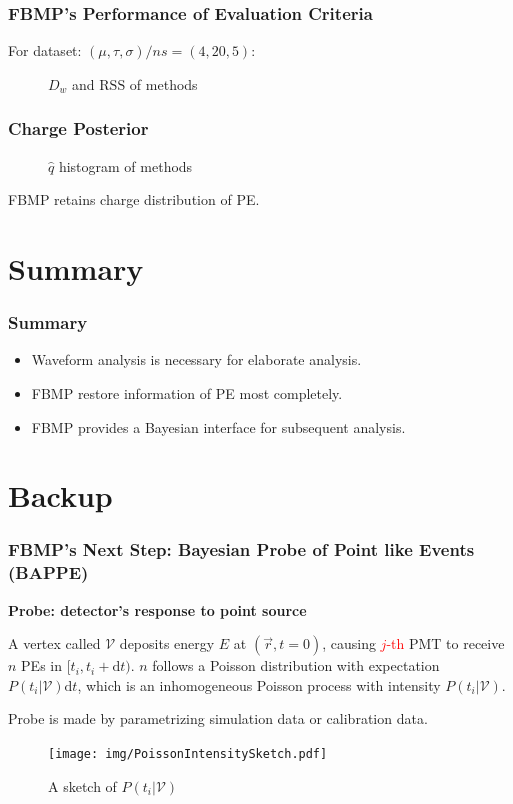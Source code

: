 \documentclass{beamer}
\newcommand{\dd}{\mathrm{d}}
\begin{document}
\begin{frame}
\frametitle{FBMP's Performance of Evaluation Criteria}
For dataset: $(\mu, \tau, \sigma)/\si{ns}=(4, 20, 5)$: 
\begin{figure}
    \centering
    \resizebox{\textwidth}{!}{}
    \caption{$D_w$ and $\mathrm{RSS}$ of methods}
\end{figure}
\end{frame}

\begin{frame}
\frametitle{Charge Posterior}
\begin{figure}
    \centering
    \resizebox{0.7\textwidth}{!}{}
    \caption{$\hat{q}$ histogram of methods}
\end{figure}
\begin{block}{}
FBMP retains charge distribution of PE. 
\end{block}
\end{frame}

\section{Summary}

\begin{frame}
\frametitle{Summary}
\begin{itemize}
    \item Waveform analysis is necessary for elaborate analysis. 
    \item FBMP restore information of PE most completely. 
    \item FBMP provides a Bayesian interface for subsequent analysis. 
\end{itemize}
\end{frame}

\section{Backup}
\label{sec:FBMP's Next Step: Bayesian Probe of Point like Events (BAPPE)}

\begin{frame}
    \frametitle{FBMP's Next Step: Bayesian Probe of Point like Events (BAPPE)}
    \textbf{Probe: detector's response to point source}
    
    A vertex called $\mathcal{V}$ deposits energy $E$ at $(\vec{r},t=0)$, causing \textcolor{red}{$j$-th} PMT to receive $n$ PEs in $[t_i, t_i+\dd t)$. $n$ follows a Poisson distribution with expectation $P(t_i|\mathcal{V})\dd t$, which is an inhomogeneous Poisson process with intensity $P(t_i|\mathcal{V})$.
    
    Probe is made by parametrizing simulation data or calibration data. \cite{lin_fast_2016}

    \begin{figure}[H]
        \centering
            \texttt{[image: img/PoissonIntensitySketch.pdf]}
        \caption{A sketch of $P(t_i|\mathcal{V})$}
        \label{fig:1}
    \end{figure}
\end{frame}
\end{document}
